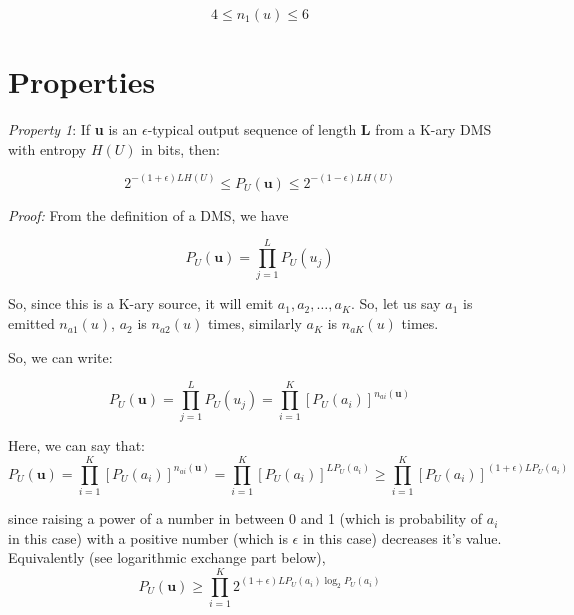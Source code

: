 \documentclass[11pt]{article}
\begin{document}
\begin{equation}
4 \leq n_{1}(u) \leq 6
\end{equation}


\section{Properties}

\textit{Property 1}: If \textbf{u} is an $\epsilon$-typical output sequence of length \textbf{L} from a K-ary
DMS with entropy $H(U)$ in bits, then:

\begin{equation}
2^{-(1+\epsilon)LH(U)} \leq P_{U}(\textbf{u}) \leq 2^{-(1-\epsilon)LH(U)}
\end{equation}

\textit{Proof:} From the definition of a DMS, we have

\begin{equation}
P_{U}(\textbf{u}) = \prod\limits_{j=1}^L P_{U}(u_{j})
\end{equation}

So, since this is a K-ary source, it will emit $a_{1}, a_{2}, \dots, a_{K}$. So, let us say $a_{1}$ is emitted $n_{a1}(u)$, $a_{2}$ is $n_{a2}(u)$ times, similarly $a_{K}$ is $n_{aK}(u)$ times. 

So, we can write:

\begin{equation}
P_{U}(\textbf{u}) = \prod_{j=1}^LP_{U}(u_{j}) = \prod_{i=1}^K[P_{U}(a_{i})]^{n_{ai}(\textbf{u})}
\end{equation}

Here, we can say that:
\\
\begin{equation}
P_{U}(\textbf{u}) = \prod_{i=1}^K[P_{U}(a_{i})]^{n_{ai}(\textbf{u})} = \prod_{i=1}^K[P_{U}(a_{i})]^{LP_{U}(a_{i})} \geq \prod_{i=1}^K[P_{U}(a_{i})]^{(1+\epsilon)LP_{U}(a_{i})}
\end{equation}

since raising a power of a number in between 0 and 1 (which is probability of $a_{i}$ in this case) with a positive number (which is $\epsilon$ in this case) decreases it's value.
\\ 

Equivalently (see logarithmic exchange part below),
\begin{equation}
P_{U}(\textbf{u}) \geq \prod_{i=1}^K2^{(1+\epsilon)LP_{U}(a_{i})\log_{2}P_{U}(a_{i})}
\end{equation}
\\
\end{document}

